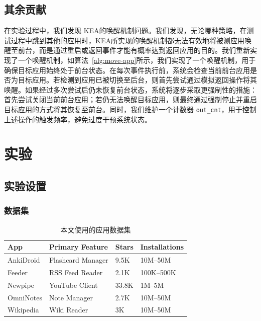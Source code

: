 \documentclass[twocolumn, 10pt]{article}
\newcommand{\kea}{K{\small\MakeUppercase{ea}}}
\begin{document}
\subsection{其余贡献}
\label{sec:other}

在实验过程中，我们发现 \kea 的唤醒机制问题。我们发现，无论哪种策略，在测试过程中跳到其他的应用时，\kea 所实现的唤醒机制都无法有效地将被测应用唤醒至前台，而是通过重启或返回事件才能有概率达到返回应用的目的。我们重新实现了一个唤醒机制，如算法~\ref{alg:move-app}所示，我们实现了一个唤醒机制，用于确保目标应用始终处于前台状态。在每次事件执行前，系统会检查当前前台应用是否为目标应用。若检测到应用已被切换至后台，则首先尝试通过模拟返回操作将其唤醒。如果经过多次尝试后仍未恢复前台状态，系统将逐步采取更强制性的措施：首先尝试关闭当前前台应用；若仍无法唤醒目标应用，则最终通过强制停止并重启目标应用的方式将其恢复至前台。同时，我们维护一个计数器 \texttt{out\_cnt}，用于控制上述操作的触发频率，避免过度干预系统状态。

\section{实验}

\subsection{实验设置}
\label{sec:setup}

\subsubsection{数据集}
\label{sec:dataset}

\begin{table}[t]
\small
\centering
\caption{本文使用的应用数据集}
\label{tab:app-dataset}
\begin{tabular}{@{}llll@{}}
\toprule
\textbf{App}    & \textbf{Primary Feature}        & \textbf{Stars} & \textbf{Installations} \\ 
\midrule
AnkiDroid   & Flashcard Manager     & 9.5K         & 10M–50M       \\
Feeder      & RSS Feed Reader        & 2.1K         & 100K–500K     \\
Newpipe     & YouTube Client         & 33.8K        & 1M–5M         \\
OmniNotes   & Note Manager           & 2.7K         & 10M–50M       \\
Wikipedia   & Wiki Reader    & 3K           & 10M–50M       \\
\bottomrule
\end{tabular}
\end{table}
\end{document}
